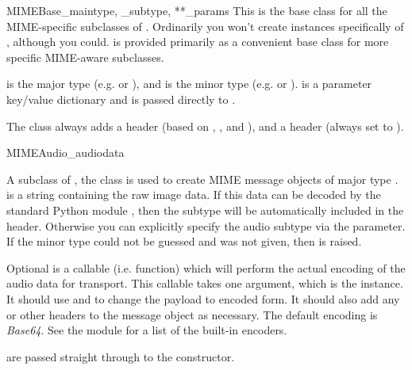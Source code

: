 \begin{classdesc}{MIMEBase}{_maintype, _subtype, **_params}
This is the base class for all the MIME-specific subclasses of
.  Ordinarily you won't create instances specifically
of , although you could.   is provided
primarily as a convenient base class for more specific MIME-aware
subclasses.

 is the  major type
(e.g.  or ), and  is the
 minor type 
(e.g.  or ).   is a parameter
key/value dictionary and is passed directly to
.

The  class always adds a  header
(based on , , and ), and a
 header (always set to ).
\end{classdesc}

\begin{classdesc}{MIMEAudio}{_audiodata}

A subclass of , the  class is used to
create MIME message objects of major type .
 is a string containing the raw image data.  If this
data can be decoded by the standard Python module ,
then the subtype will be automatically included in the
 header.  Otherwise you can explicitly specify the
audio subtype via the  parameter.  If the minor type could
not be guessed and  was not given, then 
is raised.

Optional  is a callable (i.e. function) which will
perform the actual encoding of the audio data for transport.  This
callable takes one argument, which is the  instance.
It should use  and  to
change the payload to encoded form.  It should also add any
 or other headers to the message
object as necessary.  The default encoding is \emph{Base64}.  See the
 module for a list of the built-in encoders.

 are passed straight through to the 
constructor.
\end{classdesc}

